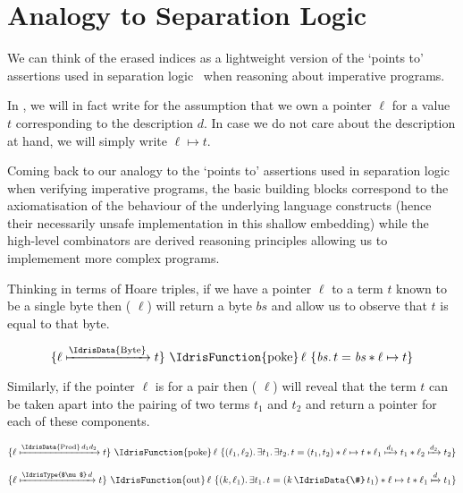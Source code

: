 \section{Analogy to Separation Logic}\label{appendix:hoare}

We can think of the erased indices  as a lightweight
version of the `points to' assertions used in separation
logic~\cite{DBLP:conf/lics/Reynolds02}
when reasoning about imperative programs.


In , we will in fact write 
for the assumption that we own a pointer $\ell$ for a value $t$
corresponding to the description $d$.
%
In case we do not care about the description at hand, we
will simply write $\ell \mapsto t$.


Coming back to our analogy to the `points to' assertions used in
separation logic~\cite{DBLP:conf/lics/Reynolds02} when verifying
imperative programs,
the basic building blocks correspond to the axiomatisation of
the behaviour of the underlying language constructs (hence their
necessarily unsafe implementation in this shallow embedding)
while the high-level combinators are derived reasoning principles
allowing us to implemement more complex programs.


Thinking in terms of Hoare triples, if we have a pointer
$\ell$ to a term $t$ known to be a single byte then
( $\ell$)
will return a byte $bs$ and allow us to observe that $t$ is
equal to that byte.

\[
\Hoare
    {\Pointer{\ell}{\text{\IdrisData{Byte}}}{t}}
    {\text{\IdrisFunction{poke}}\,\ell}
    {\mathit{bs}.\, t = \mathit{bs} \ast \ell \mapsto t}
\]

Similarly, if the pointer $\ell$ is for a pair then
( $\ell$) will
reveal that the term $t$ can be taken apart into the pairing
of two terms $t_1$ and $t_2$ and
return a pointer for each of these components.

\[
\Hoare
    {\Pointer{\ell}{\text{\IdrisData{Prod}}\, d_1 d_2}{t}}
    {\text{\IdrisFunction{poke}}\,\ell}
    {(\ell_1, \ell_2).\, \exists t_1.\, \exists t_2.\, t = (t_1, t_2)
        \ast \ell \mapsto t \ast \Pointer{\ell_1}{d_1}{t_1} \ast \Pointer{\ell_2}{d_2}{t_2}}
\]

\[
\Hoare
    {\Pointer{\ell}{\text{\IdrisType{$\mu$}}\, d}{t}}
    {\text{\IdrisFunction{out}}\, \ell}
    {(k, \ell_1).\, \exists t_1.\, t = (k \,\text{\IdrisData{\#}}\, t_1)
        \ast \ell \mapsto t \ast \Pointer{\ell_1}{d}{t_1}}
\]

